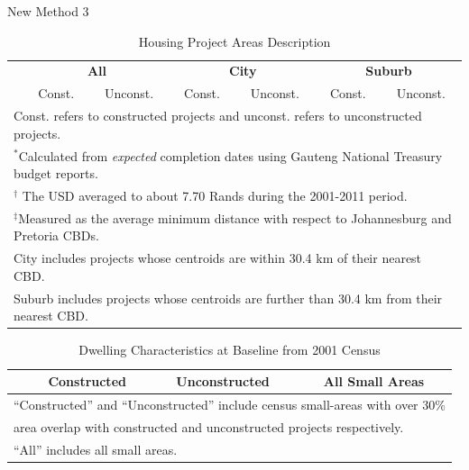 \documentclass[12pt]{article}
\begin{document}
\Large New Method 3


\vspace{0mm}
\begin{table}[h!]
\centering
\caption{Housing Project Areas Description}\label{table:projectdescriptives}
\vspace{0mm}
\begin{tabular}{l*{1}{cccccc}}
\toprule
  & \multicolumn{2}{c}{\textbf{All}}& \multicolumn{2}{c}{\textbf{City}}  & \multicolumn{2}{c}{\textbf{Suburb}}   \\
  &Const. & Unconst. &Const. & Unconst.   & Const. & Unconst. \\
\midrule

\bottomrule
\multicolumn{7}{l}{\scriptsize Const. refers to constructed projects and unconst. refers to unconstructed projects.}\\[-.5em]
\multicolumn{7}{l}{\scriptsize $^*$Calculated from {\it expected} completion dates using Gauteng National Treasury budget reports.}\\[-.5em]
\multicolumn{7}{l}{\scriptsize $^\dagger$ The USD averaged to about 7.70 Rands during the 2001-2011 period.}\\[-.5em]
\multicolumn{7}{l}{\scriptsize $^\ddagger$Measured as the average minimum distance with respect to Johannesburg and Pretoria CBDs. } \\[-.5em]
\multicolumn{7}{l}{\scriptsize City includes projects whose centroids are within 30.4 km of their nearest CBD.} \\[-.5em]
\multicolumn{7}{l}{\scriptsize Suburb includes projects whose centroids are further than 30.4 km from their nearest CBD.}
\end{tabular}
\end{table} 



\begin{table}[h!]
	\centering
	\caption{Dwelling Characteristics at Baseline from 2001 Census}\label{table:projectdescriptivescensus}
\vspace{-2mm}
\begin{tabular}{l*{1}{ccc}}
\toprule
& Constructed & Unconstructed & All Small Areas \\
\midrule
 
\bottomrule
\multicolumn{4}{l}{\scriptsize ``Constructed'' and ``Unconstructed'' include census small-areas with over 30\% } \\ [-.5em]
\multicolumn{4}{l}{\scriptsize  area overlap with constructed and unconstructed projects respectively. } \\ [-.5em]
\multicolumn{4}{l}{\scriptsize ``All''  includes all small areas.}
\end{tabular}
\end{table}
\end{document}
